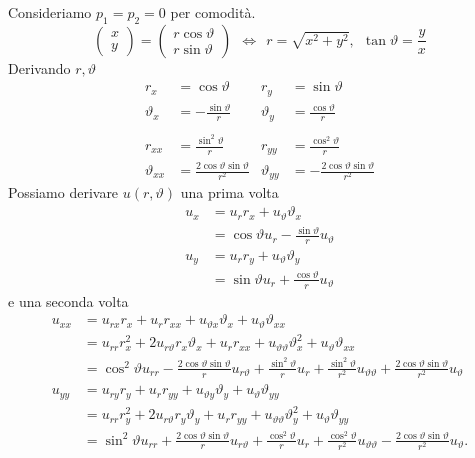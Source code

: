 \documentclass[10pt,a4paper,twoside,openright]{book}
\begin{document}
Consideriamo $p_{1} =p_{2} =0$ per comodità.
\begin{equation*}
\begin{pmatrix}
x\\
y
\end{pmatrix} =
\begin{pmatrix}
r\cos \vartheta \\
r\sin \vartheta 
\end{pmatrix} \ \ \Leftrightarrow \ \ r=\sqrt{x^{2} +y^{2}},\ \ \tan \vartheta =\frac{y}{x}
\end{equation*}
Derivando $r,\vartheta $
\begin{align*}
r_{x} & =\cos \vartheta  & r_{y} & =\sin \vartheta \\
\vartheta _{x} & =-\frac{\sin \vartheta }{r} & \vartheta _{y} & =\frac{\cos \vartheta }{r}\\
 &  &  & \\
r_{xx} & =\frac{\sin^{2} \vartheta }{r} & r_{yy} & =\frac{\cos^{2} \vartheta }{r}\\
\vartheta _{xx} & =\frac{2\cos \vartheta \sin \vartheta }{r^{2}} & \vartheta _{yy} & =-\frac{2\cos \vartheta \sin \vartheta }{r^{2}}
\end{align*}
Possiamo derivare $u(r,\vartheta)$ una prima volta
\begin{equation*}
\begin{aligned}
u_{x} & =u_{r} r_{x} +u_{\vartheta } \vartheta _{x}\\
 & =\cos \vartheta u_{r} -\frac{\sin \vartheta }{r} u_{\vartheta }\\
u_{y} & =u_{r} r_{y} +u_{\vartheta } \vartheta _{y}\\
 & =\sin \vartheta u_{r} +\frac{\cos \vartheta }{r} u_{\vartheta }
\end{aligned}
\end{equation*}
e una seconda volta
\begin{equation*}
\begin{aligned}
u_{xx} & =u_{rx} r_{x} +u_{r} r_{xx} +u_{\vartheta x} \vartheta _{x} +u_{\vartheta } \vartheta _{xx}\\
 & =u_{rr} r^{2}_{x} +2u_{r\vartheta } r_{x} \vartheta _{x} +u_{r} r_{xx} +u_{\vartheta \vartheta } \vartheta ^{2}_{x} +u_{\vartheta } \vartheta _{xx}\\
 & =\cos^{2} \vartheta u_{rr} -\frac{2\cos \vartheta \sin \vartheta }{r} u_{r\vartheta } +\frac{\sin^{2} \vartheta }{r} u_{r} +\frac{\sin^{2} \vartheta }{r^{2}} u_{\vartheta \vartheta } +\frac{2\cos \vartheta \sin \vartheta }{r^{2}} u_{\vartheta }\\
u_{yy} & =u_{ry} r_{y} +u_{r} r_{yy} +u_{\vartheta y} \vartheta _{y} +u_{\vartheta } \vartheta _{yy}\\
 & =u_{rr} r^{2}_{y} +2u_{r\vartheta } r_{y} \vartheta _{y} +u_{r} r_{yy} +u_{\vartheta \vartheta } \vartheta ^{2}_{y} +u_{\vartheta } \vartheta _{yy}\\
 & =\sin^{2} \vartheta u_{rr} +\frac{2\cos \vartheta \sin \vartheta }{r} u_{r\vartheta } +\frac{\cos^{2} \vartheta }{r} u_{r} +\frac{\cos^{2} \vartheta }{r^{2}} u_{\vartheta \vartheta } -\frac{2\cos \vartheta \sin \vartheta }{r^{2}} u_{\vartheta } .
\end{aligned}
\end{equation*}
\end{document}
